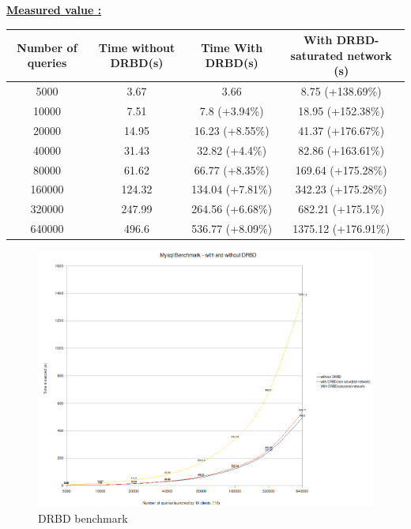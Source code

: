 \documentclass[a4paper,10pt]{report}
\begin{document}
\bigskip 

\underline{\textbf{Measured value :}}\\

\begin{tabular}{|c|c|c|c|}
\hline
Number of queries&Time without DRBD(s)&Time With DRBD(s)&With DRBD-saturated network (s)\\
\hline
5000 & 3.67 & 3.66 & 8.75 (+138.69\%)\\
\hline
10000 & 7.51 & 7.8 (+3.94\%)& 18.95 (+152.38\%)\\
\hline
20000 & 14.95 & 16.23 (+8.55\%)& 41.37 (+176.67\%)\\
\hline
40000 & 31.43 & 32.82 (+4.4\%) & 82.86 (+163.61\%)\\
\hline
80000 & 61.62 & 66.77 (+8.35\%)& 169.64 (+175.28\%)\\
\hline
160000 & 124.32 & 134.04 (+7.81\%)& 342.23 (+175.28\%)\\
\hline
320000 & 247.99 & 264.56 (+6.68\%)& 682.21 (+175.1\%)\\
\hline
640000 & 496.6 & 536.77 (+8.09\%)& 1375.12 (+176.91\%)\\
\hline
\end{tabular}




\begin{figure}[H]
\begin{center}
\includegraphics[scale=0.5]{schema/drbd-test.png}
\end{center}
\caption{DRBD benchmark} 
\label{drbdbench} 
\end{figure}
\end{document}
